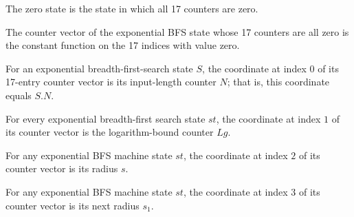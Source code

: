 \begin{definition}
\label{Complexity.LogProg.ExpBFS.St.zero}
\leanok
{}
The zero state is the state in which all 17 counters are zero.
\end{definition}

\begin{lemma}
\label{Complexity.LogProg.ExpBFS.St.toV_zero}
\leanok
{}
The counter vector of the exponential BFS state whose 17 counters are all zero is the
constant function on the 17 indices with value zero.
\end{lemma}

\begin{lemma}
\label{Complexity.LogProg.ExpBFS.St.toV_N}
\leanok
{}
For an exponential breadth-first-search state $S$, the coordinate at index $0$ of its
17-entry counter vector is its input-length counter $N$; that is, this coordinate equals
$S.N$.
\end{lemma}

\begin{lemma}
\label{Complexity.LogProg.ExpBFS.St.toV_Lg}
\leanok
{}
For every exponential breadth-first search state $st$, the coordinate at index $1$ of
its counter vector is the logarithm-bound counter $Lg$.
\end{lemma}

\begin{lemma}
\label{Complexity.LogProg.ExpBFS.St.toV_s}
\leanok
{}
For any exponential BFS machine state $st$, the coordinate at index $2$ of its counter
vector is its radius $s$.
\end{lemma}

\begin{lemma}
\label{Complexity.LogProg.ExpBFS.St.toV_s1}
\leanok
{}
For any exponential BFS machine state $st$, the coordinate at index $3$ of its counter
vector is its next radius $s_1$.
\end{lemma}

